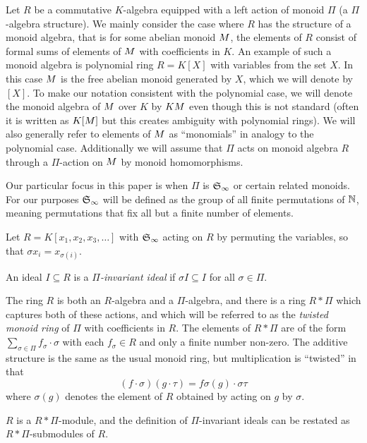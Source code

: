 Let $R$ be a commutative $K$-algebra equipped with a left action of monoid $\Pi$ (a $\Pi$-algebra structure).  We mainly consider the case where $R$ has the structure of a monoid algebra, that is for some abelian monoid $M$, the elements of $R$ consist of formal sums of elements of $M$ with coefficients in $K$.  An example of such a monoid algebra is polynomial ring $R = K[X]$ with variables from the set $X$.  In this case $M$ is the free abelian monoid generated by $X$, which we will denote by $[X]$.  To make our notation consistent with the polynomial case, we will denote the monoid algebra of $M$ over $K$ by $KM$ even though this is not standard (often it is written as $K[M]$ but this creates ambiguity with polynomial rings).  We will also generally refer to elements of $M$ as ``monomials'' in analogy to the polynomial case.  Additionally we will assume that $\Pi$ acts on monoid algebra $R$ through a $\Pi$-action on $M$ by monoid homomorphisms.

Our particular focus in this paper is when $\Pi$ is $\mathfrak S_\infty$ or certain related monoids.  For our purposes $\mathfrak S_\infty$ will be defined as the group of all finite permutations of $\mathbb N$, meaning permutations that fix all but a finite number of elements.

\begin{example}
 Let $R = K[x_1,x_2,x_3,\ldots]$ with $\mathfrak S_\infty$ acting on $R$ by permuting the variables, so that $\sigma x_i = x_{\sigma(i)}$.
\end{example}

\begin{definition}
 An ideal $I \subseteq R$ is a {\em $\Pi$-invariant ideal} if $\sigma I \subseteq I$ for all $\sigma \in \Pi$.
\end{definition}

The ring $R$ is both an $R$-algebra and a $\Pi$-algebra, and there is a ring $R*\Pi$ which captures both of these actions, and which will be referred to as the {\em twisted monoid ring} of $\Pi$ with coefficients in $R$.  The elements of $R*\Pi$ are of the form $\sum_{\sigma \in \Pi} f_{\sigma}\cdot \sigma$ with each $f_\sigma \in R$ and only a finite number non-zero.  The additive structure is the same as the usual monoid ring, but multiplication is ``twisted'' in that
 \[ (f\cdot \sigma)(g \cdot \tau) = f\sigma(g) \cdot \sigma\tau \]
where $\sigma(g)$ denotes the element of $R$ obtained by acting on $g$ by $\sigma$.

$R$ is a $R*\Pi$-module, and the definition of $\Pi$-invariant ideals can be restated as $R*\Pi$-submodules of $R$.

